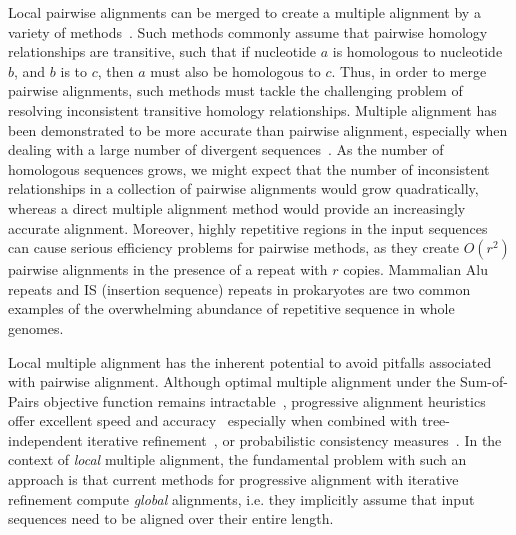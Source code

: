\documentclass[12pt,journal,letterpaper,onecolumn, draftcls]{IEEEtran}
\begin{document}
Local pairwise alignments can be merged to create a multiple alignment by a variety of
methods~\cite{ref-tba,ref-dialign,ref-related1}. Such methods commonly assume that pairwise homology relationships are transitive, such that if nucleotide $a$ is homologous to nucleotide $b$, and $b$ is to $c$, then $a$ must also be homologous to $c$.  Thus, in order to merge pairwise alignments, such methods must tackle the challenging problem of resolving inconsistent transitive homology relationships.
Multiple alignment has been demonstrated to be more accurate than pairwise alignment, especially when dealing with a large number of divergent sequences~\cite{ref-mlagan,ref-aubergene}.  As the number of homologous sequences grows, we might expect that the number of inconsistent relationships in a collection of pairwise alignments would grow quadratically, whereas a direct multiple alignment method would provide an increasingly accurate alignment.  Moreover, highly repetitive regions in the input sequences can cause serious efficiency
problems for pairwise methods, as they create $O(r^{2})$ pairwise alignments in the presence of a repeat with $r$ copies.  Mammalian Alu repeats and IS (insertion sequence) repeats in prokaryotes are two common examples of the overwhelming abundance of repetitive sequence in whole genomes.

Local multiple alignment has the inherent potential to avoid pitfalls associated with pairwise alignment. Although optimal multiple alignment under the Sum-of-Pairs objective function remains intractable~\cite{ref-wangjiang}, progressive alignment heuristics offer excellent speed and accuracy~\cite{ref-clustalw,ref-tcoffee} especially when combined with tree-independent iterative
refinement~\cite{ref-muscle}, or probabilistic consistency measures~\cite{ref-probcons}. In the context of \textit{local}
multiple alignment, the fundamental problem with such an approach is
that current methods for progressive alignment with iterative
refinement compute \textit{global} alignments, i.e. they implicitly
assume that input sequences need to be aligned over their entire length.
\end{document}

